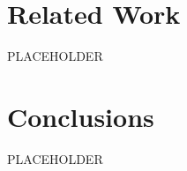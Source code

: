 \documentclass[conference]{IEEEtran}
\begin{document}
\section{Related Work}

PLACEHOLDER 



\section{Conclusions}

PLACEHOLDER





\end{document}
